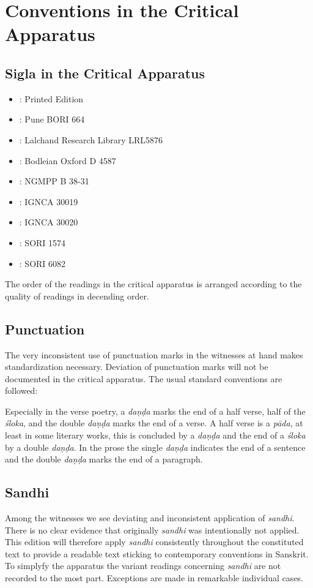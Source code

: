 \documentclass[11pt,showtrims]{memoir}
\begin{document}
\chapter{Conventions in the Critical Apparatus}
\section{Sigla in the Critical Apparatus}
\begin{itemize}
\item \edprint : Printed Edition
\item \pune : Pune BORI 664
\item \lalchand : Lalchand Research Library LRL5876
\item \oxford : Bodleian Oxford D 4587
\item \nepal : NGMPP B 38-31
\item \dehlia: IGNCA 30019
\item \dehlib: IGNCA 30020
\item \ujjaina: SORI 1574
\item \ujjainb: SORI 6082
\end{itemize}

The order of the readings in the critical apparatus is arranged according to the quality of readings in decending order.  

\section{Punctuation}

The very inconsistent use of punctuation marks in the witnesses at hand makes standardization necessary. Deviation of punctuation marks will not be documented in the critical apparatus. The usual standard conventions are followed:

Especially in the verse poetry, a \textit{daṇḍa} marks the end of a half verse, half of the \textit{śloka}, and the double \textit{daṇḍa} marks the end of a verse. A half verse is a \textit{pāda}, at least in some literary works, this is concluded by a \textit{daṇḍa} and the end of a \textit{śloka} by a double \textit{daṇḍa}. In the prose the single \textit{daṇḍa} indicates the end of a sentence and the double \textit{daṇḍa} marks the end of a paragraph.

\section{Sandhi}

Among the witnesses we see deviating and inconsistent application of \textit{sandhi}. There is no clear evidence that originally \textit{sandhi} was intentionally not applied. This edition will therefore apply \textit{sandhi} consistently throughout the constituted text to provide a readable text sticking to contemporary conventions in Sanskrit. To simplyfy the apparatus the variant readings concerning \textit{sandhi} are not recorded to the most part. Exceptions are made in remarkable individual cases. 
\end{document}
